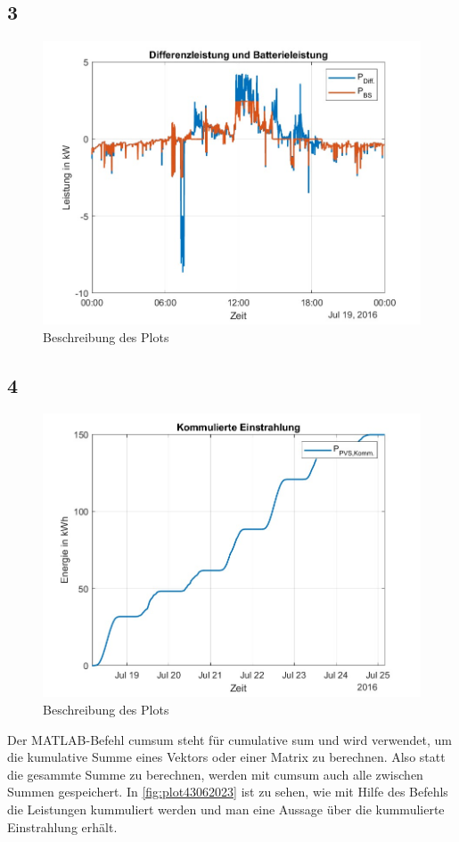 \subsection{3}
\begin{figure}[H]
    \centering
    \includegraphics[width=\textwidth]{Abbildungen/plot_vorbereitungsfrage3.jpg}
    \caption{Beschreibung des Plots}
    \label{fig:plot3062023}
\end{figure}
\subsection{4}
\begin{figure}[H]
    \centering
    \includegraphics[width=\textwidth]{Abbildungen/plot_vorbereitungsfrage4.jpg}
    \caption{Beschreibung des Plots}
    \label{fig:plot43062023}
\end{figure}
Der MATLAB-Befehl cumsum steht für cumulative sum und wird verwendet, um die kumulative Summe eines Vektors oder einer Matrix zu berechnen. 
Also statt die gesammte Summe zu berechnen, werden mit cumsum auch alle zwischen Summen gespeichert. In \autoref{fig:plot43062023} ist zu sehen, wie mit Hilfe des Befehls die Leistungen kummuliert werden und man eine Aussage über die kummulierte Einstrahlung erhält.